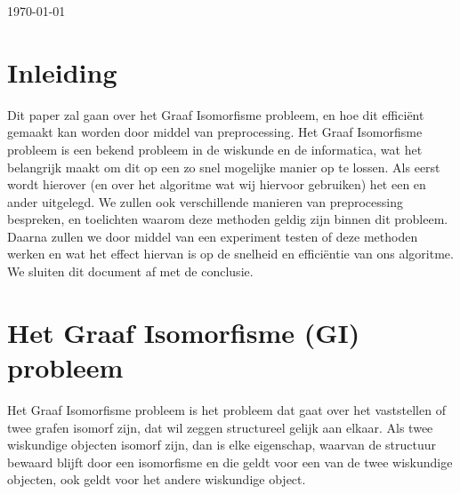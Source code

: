 \documentclass{article}
\begin{document}
\begin{titlepage}

		{\large \today}\\[3cm]

		\pagebreak 						%

\end{titlepage}


\renewcommand*\contentsname{Inhoudsopgave}
\tableofcontents{}
\pagebreak


\section{Inleiding}
Dit paper zal gaan over het Graaf Isomorfisme probleem, en hoe dit effici\"ent gemaakt kan worden door middel van preprocessing. Het Graaf Isomorfisme probleem is een bekend probleem in de wiskunde en de informatica, wat het belangrijk maakt om dit op een zo snel mogelijke manier op te lossen. Als eerst wordt hierover (en over het algoritme wat wij hiervoor gebruiken) het een en ander uitgelegd. We zullen ook verschillende manieren van preprocessing bespreken, en toelichten waarom deze methoden geldig zijn binnen dit probleem. Daarna zullen we door middel van een experiment testen of deze methoden werken en wat het effect hiervan is op de snelheid en effici\"entie van ons algoritme. We sluiten dit document af met de conclusie.
\pagebreak


\section{Het Graaf Isomorfisme (GI) probleem}
Het Graaf Isomorfisme probleem is het probleem dat gaat over het vaststellen of twee grafen isomorf zijn, dat wil zeggen structureel gelijk aan elkaar. Als twee wiskundige objecten isomorf zijn, dan is elke eigenschap, waarvan de structuur bewaard blijft door een isomorfisme en die geldt voor een van de twee wiskundige objecten, ook geldt voor het andere wiskundige object.\\
\end{document}
